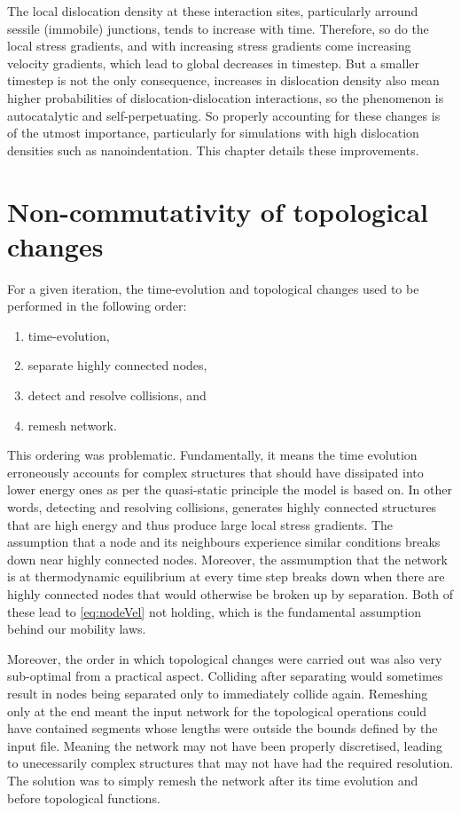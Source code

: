 The local dislocation density at these interaction sites, particularly arround sessile (immobile) junctions, tends to increase with time. Therefore, so do the local stress gradients, and with increasing stress gradients come increasing velocity gradients, which lead to global decreases in timestep. But a smaller timestep is not the only consequence, increases in dislocation density also mean higher probabilities of dislocation-dislocation interactions, so the phenomenon is autocatalytic and self-perpetuating. So properly accounting for these changes is of the utmost importance, particularly for simulations with high dislocation densities such as nanoindentation. This chapter details these improvements.

\section{Non-commutativity of topological changes}\label{s:nonCommutativity}

For a given iteration, the time-evolution and topological changes used to be performed in the following order:
\begin{enumerate}
    \item time-evolution,
    \item separate highly connected nodes,
    \item detect and resolve collisions, and
    \item remesh network.
\end{enumerate}
This ordering was problematic. Fundamentally, it means the time evolution erroneously accounts for complex structures that should have dissipated into lower energy ones as per the quasi-static principle the model is based on. In other words, detecting and resolving collisions, generates highly connected structures that are high energy and thus produce large local stress gradients. The assumption that a node and its neighbours experience similar conditions breaks down near highly connected nodes. Moreover, the assmumption that the network is at thermodynamic equilibrium at every time step breaks down when there are highly connected nodes that would otherwise be broken up by separation. Both of these lead to \cref{eq:nodeVel} not holding, which is the fundamental assumption behind our mobility laws.

Moreover, the order in which topological changes were carried out was also very sub-optimal from a practical aspect. Colliding after separating would sometimes result in nodes being separated only to immediately collide again. Remeshing only at the end meant the input network for the topological operations could have contained segments whose lengths were outside the bounds defined by the input file. Meaning the network may not have been properly discretised, leading to unecessarily complex structures that may not have had the required resolution. The solution was to simply remesh the network after its time evolution and before topological functions.

